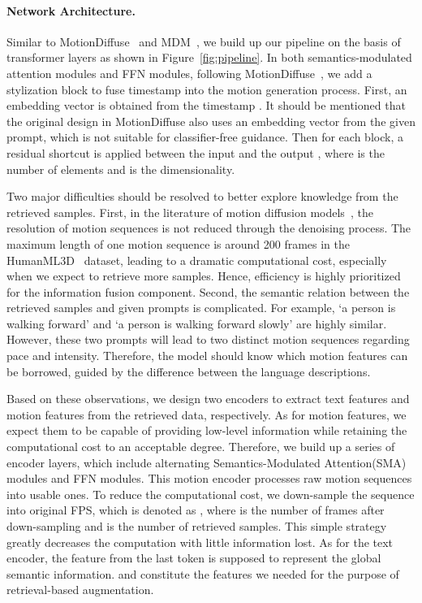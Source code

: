 \documentclass[10pt,twocolumn,letterpaper]{article}
\begin{document}
\paragraph{Network Architecture.} Similar to MotionDiffuse~\cite{zhang2022motiondiffuse} and MDM~\cite{tevet2022human}, we build up our pipeline on the basis of transformer layers as shown in Figure~\ref{fig:pipeline}. In both semantics-modulated attention modules and FFN modules, following MotionDiffuse~\cite{zhang2022motiondiffuse}, we add a stylization block to fuse timestamp  into the motion generation process. First, an embedding vector  is obtained from the timestamp . It should be mentioned that the original design in MotionDiffuse also uses an embedding vector from the given prompt, which is not suitable for classifier-free guidance. Then for each block, a residual shortcut is applied between the input  and the output , where  is the number of elements and  is the dimensionality.

Two major difficulties should be resolved to better explore knowledge from the retrieved samples. First, in the literature of motion diffusion models~\cite{zhang2022motiondiffuse,tevet2022human}, the resolution of motion sequences is not reduced through the denoising process. The maximum length of one motion sequence is around 200 frames in the HumanML3D~\cite{guo2022generating} dataset, leading to a dramatic computational cost, especially when we expect to retrieve more samples. Hence, efficiency is highly prioritized for the information fusion component. Second, the semantic relation between the retrieved samples and given prompts is complicated. For example, `a person is walking forward' and `a person is walking forward slowly' are highly similar. However, these two prompts will lead to two distinct motion sequences regarding pace and intensity. Therefore, the model should know which motion features can be borrowed, guided by the difference between the language descriptions.

Based on these observations, we design two encoders to extract text features and motion features from the retrieved data, respectively. As for motion features, we expect them to be capable of providing low-level information while retaining the computational cost to an acceptable degree. Therefore, we build up a series of encoder layers, which include alternating Semantics-Modulated Attention(SMA) modules and FFN modules. This motion encoder processes raw motion sequences into usable ones. To reduce the computational cost, we down-sample the sequence into  original FPS, which is denoted as , where  is the number of frames after down-sampling and  is the number of retrieved samples. This simple strategy greatly decreases the computation with little information lost. As for the text encoder, the feature  from the last token is supposed to represent the global semantic information.  and  constitute the features we needed for the purpose of retrieval-based augmentation.
\end{document}
